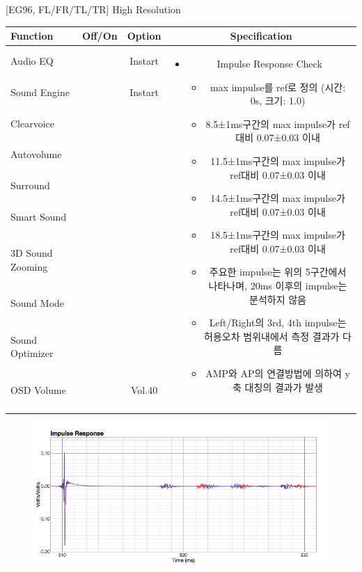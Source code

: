 \begin{frame}[t]{[EG96, FL/FR/TL/TR] High Resolution}
\begin{tiny}
\begin{tabular}{@{}lccc@{}}
\toprule
Function & Off/On & Option & Specification \\
\midrule
Audio EQ & \color{blue}{On} & Instart &
\multirow{10}{60mm}{
\begin{itemize}
\item Impulse Response Check
  \begin{itemize}
  \item max impulse를 ref로 정의 (시간: 0s, 크기: 1.0)
  \item 8.5±1ms구간의 max impulse가 ref대비 0.07±0.03 이내
  \item 11.5±1ms구간의 max impulse가 ref대비 0.07±0.03 이내
  \item 14.5±1ms구간의 max impulse가 ref대비 0.07±0.03 이내
  \item 18.5±1ms구간의 max impulse가 ref대비 0.07±0.03 이내
  \item 주요한 impulse는 위의 5구간에서 나타나며, 20ms 이후의 impulse는 분석하지 않음
  \item Left/Right의 3rd, 4th impulse는 허용오차 범위내에서 측정 결과가 다름
  \item AMP와 AP의 연결방법에 의하여 y축 대칭의 결과가 발생
  \end{itemize}
\end{itemize}
} \\
Sound Engine & \color{blue}{On} & Instart & \\
Clearvoice & \color{black}{Off} & & \\
Autovolume & \color{black}{Off} & & \\
Surround & \color{black}{Off} & & \\
Smart Sound & \color{black}{Off} & & \\
3D Sound Zooming & \color{black}{Off} & & \\
Sound Mode & \color{blue}{On} & \color{black}{Standard} & \\
Sound Optimizer & \color{black}{Off} & & \\
OSD Volume & \color{blue}{On} & Vol.40 & \\
 & & & \\
 & & & \\
\midrule
\end{tabular}
\end{tiny}

\begin{figure}[b]
\includegraphics[height=0.4\textwidth]{figures/highresolution.png}
\end{figure}

\end{frame}

